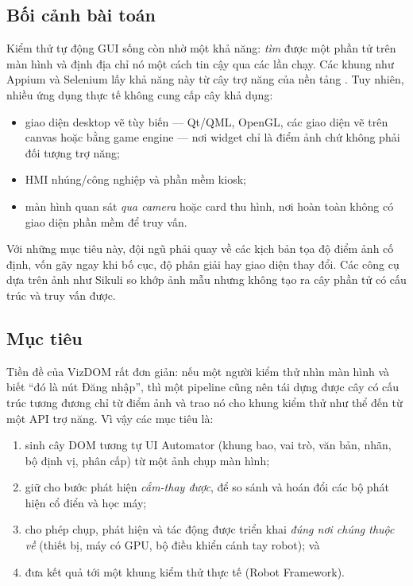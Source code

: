 \documentclass[11pt,a4paper]{article}
\begin{document}
\subsection{Bối cảnh bài toán}
Kiểm thử tự động GUI sống còn nhờ một khả năng: \emph{tìm} được một phần tử trên
màn hình và định địa chỉ nó một cách tin cậy qua các lần chạy. Các khung như Appium
và Selenium lấy khả năng này từ cây trợ năng của nền tảng \cite{uiautomator,appium}.
Tuy nhiên, nhiều ứng dụng thực tế không cung cấp cây khả dụng:
\begin{itemize}[leftmargin=1.4em]
  \item giao diện desktop vẽ tùy biến --- Qt/QML, OpenGL, các giao diện vẽ trên
        canvas hoặc bằng game engine --- nơi widget chỉ là điểm ảnh chứ không phải
        đối tượng trợ năng;
  \item HMI nhúng/công nghiệp và phần mềm kiosk;
  \item màn hình quan sát \emph{qua camera} hoặc card thu hình, nơi hoàn toàn không
        có giao diện phần mềm để truy vấn.
\end{itemize}
Với những mục tiêu này, đội ngũ phải quay về các kịch bản tọa độ điểm ảnh cố định,
vốn gãy ngay khi bố cục, độ phân giải hay giao diện thay đổi. Các công cụ dựa trên
ảnh như Sikuli \cite{yeh2009sikuli} so khớp ảnh mẫu nhưng không tạo ra cây phần tử
có cấu trúc và truy vấn được.

\subsection{Mục tiêu}
Tiền đề của VizDOM rất đơn giản: nếu một người kiểm thử nhìn màn hình và biết ``đó
là nút Đăng nhập'', thì một pipeline cũng nên tái dựng được cây có cấu trúc tương
đương chỉ từ điểm ảnh và trao nó cho khung kiểm thử như thể đến từ một API trợ năng.
Vì vậy các mục tiêu là:
\begin{enumerate}[leftmargin=1.6em]
  \item sinh cây DOM tương tự UI Automator (khung bao, vai trò, văn bản, nhãn, bộ
        định vị, phân cấp) từ một ảnh chụp màn hình;
  \item giữ cho bước phát hiện \emph{cắm-thay được}, để so sánh và hoán đổi các bộ
        phát hiện cổ điển và học máy;
  \item cho phép chụp, phát hiện và tác động được triển khai \emph{đúng nơi chúng
        thuộc về} (thiết bị, máy có GPU, bộ điều khiển cánh tay robot); và
  \item đưa kết quả tới một khung kiểm thử thực tế (Robot Framework).
\end{enumerate}
\end{document}

